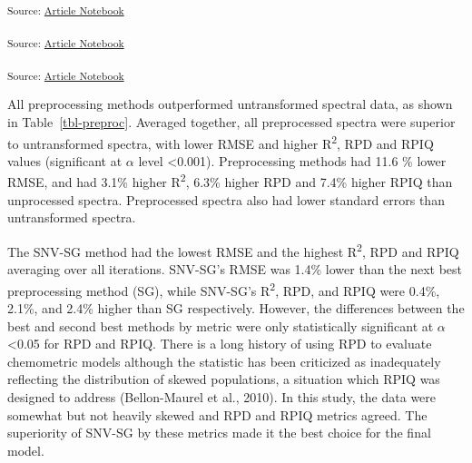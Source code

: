 \documentclass[
]{agujournal2019}
\begin{document}
\textsubscript{Source:
\href{https://rvcrawford.github.io/glowing-system/index.qmd.html}{Article
Notebook}}

\textsubscript{Source:
\href{https://rvcrawford.github.io/glowing-system/index.qmd.html}{Article
Notebook}}

\textsubscript{Source:
\href{https://rvcrawford.github.io/glowing-system/index.qmd.html}{Article
Notebook}}

All preprocessing methods outperformed untransformed spectral data, as
shown in Table~\ref{tbl-preproc}. Averaged together, all preprocessed
spectra were superior to untransformed spectra, with lower RMSE and
higher R\textsuperscript{2}, RPD and RPIQ values (significant at
\(\alpha\) level \textless0.001). Preprocessing methods had 11.6 \%
lower RMSE, and had 3.1\% higher R\textsuperscript{2}, 6.3\% higher RPD
and 7.4\% higher RPIQ than unprocessed spectra. Preprocessed spectra
also had lower standard errors than untransformed spectra.

The SNV-SG method had the lowest RMSE and the highest
R\textsuperscript{2}, RPD and RPIQ averaging over all iterations.
SNV-SG's RMSE was 1.4\% lower than the next best preprocessing method
(SG), while SNV-SG's R\textsuperscript{2}, RPD, and RPIQ were 0.4\%,
2.1\%, and 2.4\% higher than SG respectively. However, the differences
between the best and second best methods by metric were only
statistically significant at \(\alpha\) \textless0.05 for RPD and RPIQ.
There is a long history of using RPD to evaluate chemometric models
although the statistic has been criticized as inadequately reflecting
the distribution of skewed populations, a situation which RPIQ was
designed to address (Bellon-Maurel et al., 2010). In this study, the
data were somewhat but not heavily skewed and RPD and RPIQ metrics
agreed. The superiority of SNV-SG by these metrics made it the best
choice for the final model.
\end{document}
